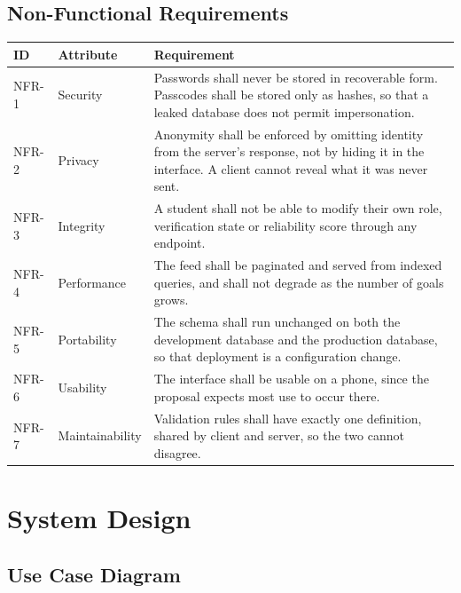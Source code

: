 \documentclass[twoside,12pt]{tietreport}
\begin{document}
\section{Non-Functional Requirements}

\begin{longtable}{@{}p{1.6cm}p{3.0cm}p{8.2cm}@{}}
\toprule
\textbf{ID} & \textbf{Attribute} & \textbf{Requirement} \\
\midrule
\endhead
NFR-1 & Security &
Passwords shall never be stored in recoverable form. Passcodes shall be stored
only as hashes, so that a leaked database does not permit impersonation. \\
\addlinespace
NFR-2 & Privacy &
Anonymity shall be enforced by omitting identity from the server's response, not
by hiding it in the interface. A client cannot reveal what it was never sent. \\
\addlinespace
NFR-3 & Integrity &
A student shall not be able to modify their own role, verification state or
reliability score through any endpoint. \\
\addlinespace
NFR-4 & Performance &
The feed shall be paginated and served from indexed queries, and shall not
degrade as the number of goals grows. \\
\addlinespace
NFR-5 & Portability &
The schema shall run unchanged on both the development database and the
production database, so that deployment is a configuration change. \\
\addlinespace
NFR-6 & Usability &
The interface shall be usable on a phone, since the proposal expects most use to
occur there. \\
\addlinespace
NFR-7 & Maintainability &
Validation rules shall have exactly one definition, shared by client and server,
so the two cannot disagree. \\
\bottomrule
\end{longtable}

\chapter{System Design}
\label{ch:design}

\section{Use Case Diagram}
\end{document}
